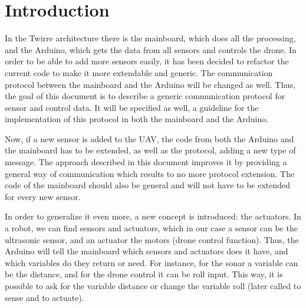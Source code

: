 \documentclass[11pt,a4paper,oneside]{book}
\title{\MYTITLE}
\author{\MYAUTHOR}
\begin{document}
\frontmatter

\maketitle

\mainmatter


\begin{versionhistory}
\end{versionhistory}


\chapter{Introduction}

In the Twirre architecture there is the mainboard, which does all the processing, and the Arduino, which gets the data from all sensors and controls the drone. In order to be able to add more sensors easily, it has been decided to refactor the current code to make it more extendable and generic. The communication protocol between the mainboard and the Arduino will be changed as well. Thus, the goal of this document is to describe a generic communication protocol for sensor and control data. It will be specified as well, a guideline for the implementation of this protocol in both the mainboard and the Arduino.

Now, if a new sensor is added to the UAV, the code from both the Arduino and the mainboard has to be extended, as well as the protocol, adding a new type of message. The approach described in this document improves it by providing a general way of communication which results to no more protocol extension. The code of the mainboard should also be general and will not have to be extended for every new sensor.

In order to generalize it even more, a new concept is introduced: the actuators. In a robot, we can find sensors and actuators, which in our case a sensor can be the ultrasonic sensor, and an actuator the motors (drone control function). Thus, the Arduino will tell the mainboard which sensors and actuators does it have, and which variables do they return or need. For instance, for the sonar a variable can be the distance, and for the drone control it can be roll input. This way, it is possible to ask for the variable distance or change the variable roll (later called to sense and to actuate).
\end{document}
